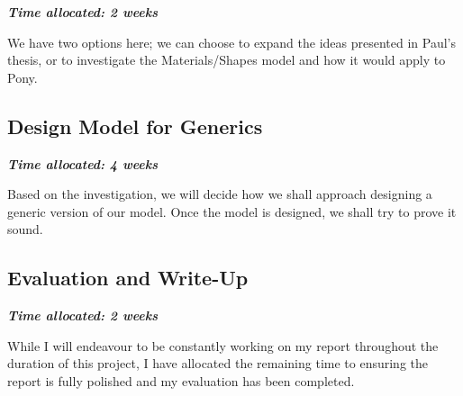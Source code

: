 \textit{\textbf{Time allocated: 2 weeks}}

We have two options here; we can choose to expand the ideas presented in Paul's thesis, or to investigate the Materials/Shapes model and how it would apply to Pony.

\subsection{Design Model for Generics}

\textit{\textbf{Time allocated: 4 weeks}}

Based on the investigation, we will decide how we shall approach designing a generic version of our model. Once the model is designed, we shall try to prove it sound.


\subsection{Evaluation and Write-Up}

\textit{\textbf{Time allocated: 2 weeks}}

While I will endeavour to be constantly working on my report throughout the duration of this project, I have allocated the remaining time to ensuring the report is fully polished and my evaluation has been completed.

